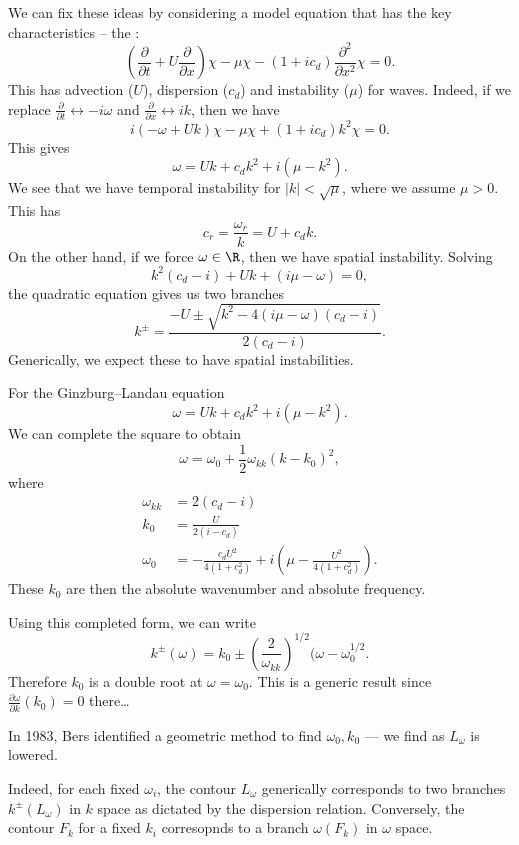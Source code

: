 \documentclass[a4paper]{article}
\begin{document}
\begin{eg}
We can fix these ideas by considering a model equation that has the key characteristics -- the :
\[
  \left(\frac{\partial}{\partial t} + U \frac{\partial}{\partial x}\right) \chi - \mu \chi - (1 + i c_d) \frac{\partial^2}{\partial x^2}\chi = 0.
\]
This has advection ($U$), dispersion ($c_d$) and instability ($\mu$) for waves. Indeed, if we replace $\frac{\partial}{\partial t} \leftrightarrow -i\omega$ and $\frac{\partial}{\partial x} \leftrightarrow ik$, then we have
\[
  i(-\omega + Uk)\chi - \mu \chi + (1 + ic_d) k^2 \chi = 0.
\]
This gives
\[
  \omega = Uk + c_d k^2 + i(\mu - k^2).
\]
We see that we have temporal instability for $|k| < \sqrt{\mu}$, where we assume $\mu > 0$. This has
\[
  c_r = \frac{\omega_r}{k} = U + c_d k.
\]
On the other hand, if we force $\omega \in \R$, then we have spatial instability. Solving
\[
  k^2 (c_d - i) + Uk + (i\mu - \omega) = 0,
\]
the quadratic equation gives us two branches
\[
  k^{\pm} = \frac{-U \pm \sqrt{k^2 - 4(i\mu - \omega)(c_d - i)}}{2(c_d - i)}.
\]
Generically, we expect these to have spatial instabilities.


  For the Ginzburg--Landau equation
  \[
    \omega = Uk + c_d k^2 + i (\mu - k^2).
  \]
  We can complete the square to obtain
  \[
    \omega = \omega_0 + \frac{1}{2} \omega_{kk}(k - k_0)^2,
  \]
  where
  \begin{align*}
    \omega_{kk} &= 2(c_d - i)\\
    k_0 &= \frac{U}{2(i - c_d)}\\
    \omega_0 &= -\frac{c_d U^2}{4(1 + c_d^2)} +i \left(\mu - \frac{U^2}{4(1 + c_d^2)}\right).
  \end{align*}
  These $k_0$ are then the absolute wavenumber and absolute frequency. %
\end{eg}

Using this completed form, we can write
\[
  k^{\pm}(\omega) = k_0 \pm \left(\frac{2}{\omega_{kk}}\right)^{1/2} (\omega - \omega_0^{1/2}.
\]
Therefore $k_0$ is a double root at $\omega = \omega_0$. This is a generic result since $\frac{\partial \omega}{\partial k}(k_0) = 0$ there\ldots

In 1983, Bers identified a geometric method to find $\omega_0, k_0$ --- we find  as $L_\omega$ is lowered.

Indeed, for each fixed $\omega_i$, the contour $L_\omega$ generically corresponds to two branches $k^{\pm}(L_\omega)$ in $k$ space as dictated by the dispersion relation. Conversely, the contour $F_k$ for a fixed $k_i$ corresopnds to a branch $\omega(F_k)$ in $\omega$ space.
\end{document}
